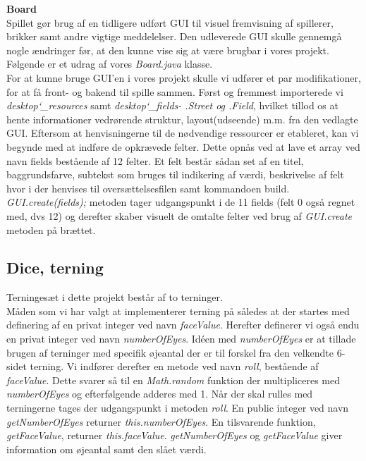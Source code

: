 \textbf{\large Board}\\

\noindent Spillet gør brug af en tidligere udført GUI til visuel fremvisning af spillerer, brikker samt andre vigtige meddelelser. 
Den udleverede GUI skulle gennemgå nogle ændringer før, at den kunne vise sig at være brugbar i vores projekt. 
Følgende er et udrag af vores \textit{Board.java} klasse.\\

\noindent For at kunne bruge GUI'en i vores projekt skulle vi udfører et par modifikationer, for at få front- og bakend til spille sammen. 
Først og fremmest importerede vi \textit{desktop\char`_resources} samt \textit{desktop\char`_fields- .Street og .Field}, hvilket tillod os at hente informationer vedrørende struktur, layout(udseende) m.m. fra den vedlagte GUI. 
Eftersom at henvisningerne til de nødvendige ressourcer er etableret, kan vi begynde med at indføre de opkrævede felter. 
Dette opnås ved at lave et array ved navn fields bestående af 12 felter. 
Et felt består sådan set af en titel, baggrundsfarve, subtekst som bruges til indikering af værdi, beskrivelse af felt hvor i der henvises til oversættelsesfilen samt kommandoen build. 
\textit{GUI.create(fields);} metoden tager udgangspunkt i de 11 fields (felt 0 også regnet med, dvs 12) og derefter skaber visuelt de omtalte felter ved brug af \textit{GUI.create} metoden på brættet.\\


\subsection{Dice, terning}
\noindent Terningesæt i dette projekt består af to terninger.\\

\noindent Måden som vi har valgt at implementerer terning på således at der startes med definering af en privat integer ved navn \textit{faceValue}.
Herefter definerer vi også endu en privat integer ved navn \textit{numberOfEyes}.
Idéen med \textit{numberOfEyes} er at tillade brugen af terninger med specifik øjeantal der er til forskel fra den velkendte 6-sidet terning.
Vi indfører derefter en metode ved navn \textit{roll}, bestående af \textit{faceValue}.
Dette svarer så til en \textit{Math.random} funktion der multipliceres med \textit{numberOfEyes} og efterfølgende adderes med 1.
Når der skal rulles med terningerne tages der udgangspunkt i metoden \textit{roll}.
En public integer ved navn \textit{getNumberOfEyes} returner \textit{this.numberOfEyes}.
En tilsvarende funktion, \textit{getFaceValue}, returner \textit{this.faceValue}.
\textit{getNumberOfEyes} og \textit{getFaceValue} giver information om øjeantal samt den slået værdi.\\

